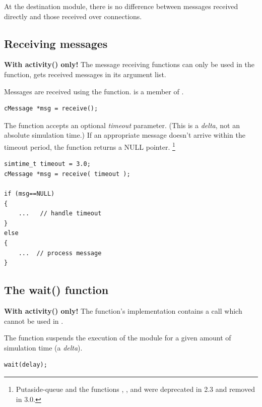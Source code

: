 At the destination module, there is no difference between messages received
directly and those received over connections.



\subsection{Receiving messages}

\textbf{With activity() only!} The message receiving functions can
only be used in the  function,
 gets received messages in its argument list.

Messages are received using the  function.
 is a member of .

\begin{verbatim}
cMessage *msg = receive();
\end{verbatim}

The  function accepts an optional \textit{timeout}
parameter. (This is a \textit{delta}, not an
absolute simulation time.) If an appropriate message doesn't arrive
within the timeout period, the function returns a NULL pointer.
    \footnote{Putaside-queue and the functions ,
    , and  were deprecated
    in {\opp} 2.3 and removed in {\opp} 3.0.}

\begin{verbatim}
simtime_t timeout = 3.0;
cMessage *msg = receive( timeout );

if (msg==NULL)
{
    ...   // handle timeout
}
else
{
    ...  // process message
}
\end{verbatim}



\subsection{The wait() function}

\textbf{With activity() only!} The  function's implementation
contains a  call which cannot be used in .

The  function suspends the execution of the module for
a given amount of simulation time (a \textit{delta}).

\begin{verbatim}
wait(delay);
\end{verbatim}

